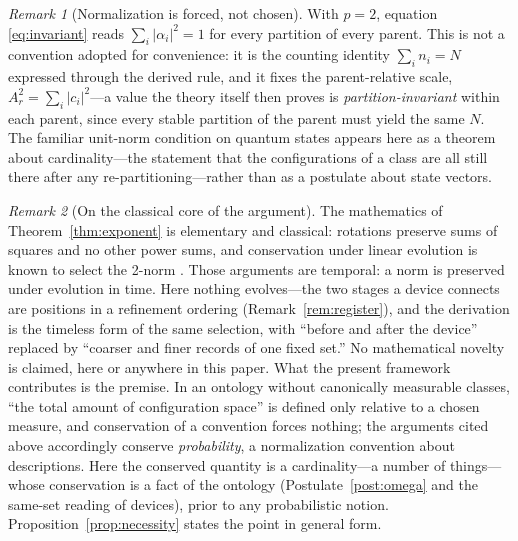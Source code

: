 \documentclass[11pt]{article}
\theoremstyle{definition}
\theoremstyle{remark}
\newtheorem{remark}{Remark}
\begin{document}
\begin{remark}[Normalization is forced, not chosen]\label{rem:norm}
With $p = 2$, equation \eqref{eq:invariant} reads $\sum_i |\alpha_i|^2 = 1$ for every partition of every parent. This is not a convention adopted for convenience: it is the counting identity $\sum_i n_i = N$ expressed through the derived rule, and it fixes the parent-relative scale, $A_r^2 = \sum_i |c_i|^2$---a value the theory itself then proves is \emph{partition-invariant} within each parent, since every stable partition of the parent must yield the same $N$. The familiar unit-norm condition on quantum states appears here as a theorem about cardinality---the statement that the configurations of a class are all still there after any re-partitioning---rather than as a postulate about state vectors.
\end{remark}

\begin{remark}[On the classical core of the argument]\label{rem:pyth}
The mathematics of Theorem~\ref{thm:exponent} is elementary and classical: rotations preserve sums of squares and no other power sums, and conservation under linear evolution is known to select the 2-norm \cite{Aaronson2004,Lamperti1958}. Those arguments are temporal: a norm is preserved under evolution in time. Here nothing evolves---the two stages a device connects are positions in a refinement ordering (Remark~\ref{rem:register}), and the derivation is the timeless form of the same selection, with ``before and after the device'' replaced by ``coarser and finer records of one fixed set.'' No mathematical novelty is claimed, here or anywhere in this paper. What the present framework contributes is the premise. In an ontology without canonically measurable classes, ``the total amount of configuration space'' is defined only relative to a chosen measure, and conservation of a convention forces nothing; the arguments cited above accordingly conserve \emph{probability}, a normalization convention about descriptions. Here the conserved quantity is a cardinality---a number of things---whose conservation is a fact of the ontology (Postulate~\ref{post:omega} and the same-set reading of devices), prior to any probabilistic notion. Proposition~\ref{prop:necessity} states the point in general form.
\end{remark}
\end{document}
